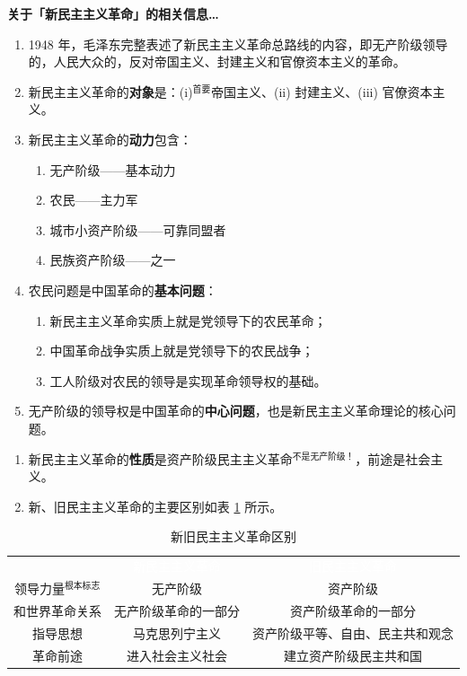\documentclass[UTF8]{ctexart}
\newcommand\Emph[2]{\colorbox{c#1-light}{\textcolor{c#1-emph}{\textbf{#2}}}}
\begin{document}
\begin{mybox}{2}
\textbf{关于「新民主主义革命」的相关信息…}
\begin{enumerate}
  \item 1948 年，毛泽东完整表述了新民主主义革命总路线的内容，即无产阶级领导的，人民大众的，反对帝国主义、封建主义和官僚资本主义的革命。
  \item 新民主主义革命的\Emph{2}{对象}是：(i)$^{\text{首要}}$帝国主义、(ii) 封建主义、(iii) 官僚资本主义。
  \item 新民主主义革命的\Emph{2}{动力}包含：
  \begin{enumerate}[label={\roman{enumii})}]
    \item 无产阶级——基本动力
    \item 农民——主力军
    \item 城市小资产阶级——可靠同盟者
    \item 民族资产阶级——之一
  \end{enumerate}
  \item 农民问题是中国革命的\Emph{2}{基本问题}：
  \begin{enumerate}[label={\roman{enumii})}, start=1]
    \item 新民主主义革命实质上就是党领导下的农民革命；
    \item 中国革命战争实质上就是党领导下的农民战争；
    \item 工人阶级对农民的领导是实现革命领导权的基础。
  \end{enumerate}
  \item 无产阶级的领导权是中国革命的\Emph{2}{中心问题}，也是新民主主义革命理论的核心问题。
\end{enumerate}
\end{mybox}

\begin{enumerate}[start=9]
  \item 新民主主义革命的\Emph{2}{性质}是资产阶级民主主义革命$^{\text{不是无产阶级！}}$，前途是社会主义。
  \item 新、旧民主主义革命的主要区别如表 \ref{tab:新-旧民主主义革命} 所示。
\end{enumerate}
\begin{table}[htb]
  \centering  \small
  \begin{tabular}{ccc}
  \rowcolor{hydro}
   & \textcolor{white}{新民主主义革命} & \textcolor{white}{旧民主主义革命} \\
  领导力量$^{\text{根本标志}}$ & 无产阶级 & 资产阶级 \\
  和世界革命关系 & 无产阶级革命的一部分 & 资产阶级革命的一部分 \\
  指导思想 & 马克思列宁主义 & 资产阶级平等、自由、民主共和观念 \\
  革命前途 & 进入社会主义社会 & 建立资产阶级民主共和国 \\
  \end{tabular}
  \caption{新旧民主主义革命区别}\label{tab:新-旧民主主义革命}
\end{table}
\end{document}
